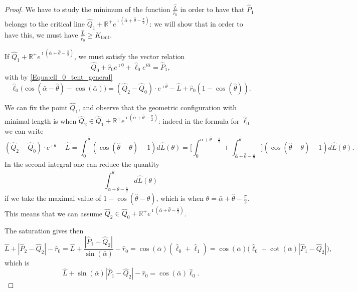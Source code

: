 \documentclass[reqno]{amsart}
\newcounter{assu}
\theoremstyle{definition} \newtheorem{definition}{Definition}[section]
\theoremstyle{definition} \newtheorem{remark}[definition]{Remark}
\theoremstyle{plain} \newtheorem{lemma}[definition]{Lemma}
\theoremstyle{plain} \newtheorem{proposition}[definition]{Proposition}
\theoremstyle{plain} \newtheorem{theorem}[definition]{Theorem}
\theoremstyle{plain} \newtheorem{corollary}[definition]{Corollary}
\theoremstyle{definition} \newtheorem{example}[definition]{Example}
\theoremstyle{plain} \newtheorem{claim}[clai]{Claim}
\theoremstyle{definition} \newtheorem{assumption}[definition]{Assumption}
\theoremstyle{definition} \newtheorem{observation}[definition]{Observation}
\newcommand{\R}{\mathbb{R}}
\newcommand{\1}{\mathbbm 1}
\renewcommand{\i}{\imath}
\numberwithin{equation}{section} %
\theoremstyle{plain} \newtheorem*{theorem*}{Theorem}
\theoremstyle{plain} \newtheorem{mthm}[maintheorem]{Main Theorem}
\theoremstyle{plain} \newtheorem*{mthm*}{Main Theorem}
\theoremstyle{plain} \newtheorem*{conjecture*}{Conjecture}
\theoremstyle{plain} \newtheorem{conjecture}[definition]{Conjecture}
\theoremstyle{plain} \newtheorem*{problem*}{Problem}
\begin{document}
\begin{proof}
We have to study the minimum of the function $\frac{\hat L}{\hat r_0}$ in order to have that $\hat P_1$ belongs to the critical line $\hat Q_1 + \R^+ e^{\i (\bar \alpha + \hat \theta - \frac{\pi}{2})}$: we will show that in order to have this, we must have $\frac{\hat L}{\hat r_0} \geq K_\mathrm{tent}$.

If $\hat Q_1 + \R^+ e^{\i (\bar \alpha + \hat \theta - \frac{\pi}{2})}$, we must satisfy the vector relation
\begin{equation*}
\hat Q_0 + \hat r_0 e^{\i 0} + \hat \ell_0 e^{i \bar \alpha} = \hat P_1,
\end{equation*}
with by \eqref{Equa:ell_0_tent_general}
\begin{equation*}
\hat \ell_0 \big( \cos(\bar \alpha - \hat \theta) - \cos(\bar \alpha) \big) = (\hat Q_2 - \hat Q_0) \cdot e^{\i \hat \theta} - \hat L + \hat r_0 (1 - \cos(\hat \theta)).
\end{equation*}

We can fix the point $\hat Q_1$, and observe that the geometric configuration with minimal length is when $\hat Q_2 \in \hat Q_1 + \R^+ e^{\i (\bar \alpha + \hat \theta - \frac{\pi}{2})}$: indeed in the formula for $\hat \ell_0$ we can write
\begin{equation*}
(\hat Q_2 - \hat Q_0) \cdot e^{\i \hat \theta} - \hat L = \int_0^{\hat \theta} (\cos(\hat \theta - \theta) - 1) d\hat L(\theta) = \bigg[ \int_0^{\bar \alpha + \hat \theta - \frac{\pi}{2}} + \int_{\bar \alpha + \hat \theta - \frac{\pi}{2}}^{\hat \theta} \bigg] (\cos(\hat \theta - \theta) - 1) d\hat L(\theta).
\end{equation*}
In the second integral one can reduce the quantity
\begin{equation*}
\int_{\bar \alpha + \hat \theta - \frac{\pi}{2}}^{\hat \theta} d\hat L(\theta)
\end{equation*}
if we take the maximal value of $1 - \cos(\hat \theta - \theta)$, which is when $\theta = \bar \alpha + \hat \theta - \frac{\pi}{2}$. This means that we can assume $\hat Q_2 \in \hat Q_0 + \R^+ e^{\i (\bar \alpha + \hat \theta - \frac{\pi}{2})}$.

The saturation gives then
\begin{equation*}
\hat L + |\hat P_2 - \hat Q_2| - \hat r_0 = \hat L + \frac{|\hat P_1 - \hat Q_2|}{\sin(\bar \alpha)} - \hat r_0 = \cos(\bar \alpha) (\hat \ell_0 + \hat \ell_1) = \cos(\bar \alpha) \big( \hat \ell_0 + \cot(\bar \alpha) |\hat P_1 - \hat Q_2| \big),
\end{equation*}
which is
\begin{equation*}
\hat L + \sin(\bar \alpha) |\hat P_1 - \hat Q_2| - \hat r_0 = \cos(\bar \alpha) \hat \ell_0.
\end{equation*}


\end{proof}
\end{document}
